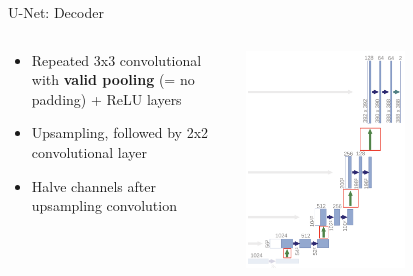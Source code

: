 \documentclass[serif, aspectratio=169]{beamer}
\begin{document}
\begin{frame}{U-Net: Decoder}
    \scriptsize
    \begin{columns} %
        \begin{column}{0.7\textwidth}
        \vspace{-1cm}
            \begin{itemize}
                \setlength\itemsep{1em} %
                \item Repeated 3x3 convolutional with \textbf{valid pooling} (= no padding) + ReLU layers
                \item Upsampling, followed by 2x2 convolutional layer
                \item Halve channels after upsampling convolution
            \end{itemize}
            
        \end{column}

        \begin{column}{0.5\textwidth}
            \begin{center}
                \includegraphics[width=0.6\textwidth]{pic/Unet decoder.png} 
            \end{center}
        \end{column}
    \end{columns}
\end{frame}
\end{document}
